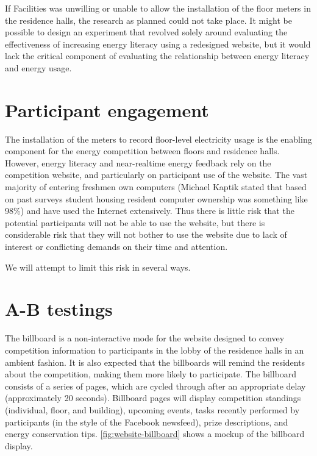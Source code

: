 If Facilities was unwilling or unable to allow the installation of the floor meters in the residence halls, the research as planned could not take place. It might be possible to design an experiment that revolved solely around evaluating the effectiveness of increasing energy literacy using a redesigned website, but it would lack the critical component of evaluating the relationship between energy literacy and energy usage.

\section{Participant engagement}
\label{sec:participant-engagement}

The installation of the meters to record floor-level electricity usage is the enabling component for the energy competition between floors and residence halls. However, energy literacy and near-realtime energy feedback rely on the competition website, and particularly on participant use of the website. The vast majority of entering freshmen own computers (Michael Kaptik stated that based on past surveys student housing resident computer ownership was something like 98\%) and have used the Internet extensively. Thus there is little risk that the potential participants will not be able to use the website, but there is considerable risk that they will not bother to use the website due to lack of interest or conflicting demands on their time and attention.

We will attempt to limit this risk in several ways. 

\section{A-B testings}
\label{ab-testing}

The billboard is a non-interactive mode for the website designed to convey competition information to participants in the lobby of the residence halls in an ambient fashion. It is also expected that the billboards will remind the residents about the competition, making them more likely to participate. The billboard consists of a series of pages, which are cycled through after an appropriate delay (approximately 20 seconds). Billboard pages will display competition standings (individual, floor, and building), upcoming events, tasks recently performed by participants (in the style of the Facebook newsfeed), prize descriptions, and energy conservation tips. \autoref{fig:website-billboard} shows a mockup of the billboard display.

